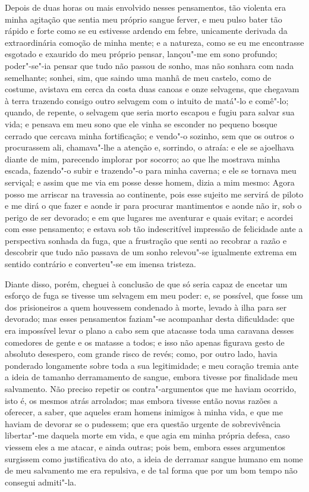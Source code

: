 Depois de duas horas ou mais envolvido nesses pensamentos, tão violenta
era minha agitação que sentia meu próprio sangue ferver, e meu pulso
bater tão rápido e forte como se eu estivesse ardendo em febre,
unicamente derivada da extraordinária comoção de minha mente; e a
natureza, como se eu me encontrasse esgotado e exaurido do meu próprio
pensar, lançou"-me em sono profundo; poder"-se"-ia pensar que tudo não
passou de sonho, mas não sonhara com nada semelhante; sonhei, sim, que
saindo uma manhã de meu castelo, como de costume, avistava em cerca da
costa duas canoas e onze selvagens, que chegavam à terra trazendo
consigo outro selvagem com o intuito de matá"-lo e comê"-lo; quando, de
repente, o selvagem que seria morto escapou e fugiu para salvar sua
vida; e pensava em meu sono que ele vinha se esconder no pequeno bosque
cerrado que cercava minha fortificação; e vendo"-o sozinho, sem que os
outros o procurassem ali, chamava"-lhe a atenção e, sorrindo, o atraía: e
ele se ajoelhava diante de mim, parecendo implorar por socorro; ao que
lhe mostrava minha escada, fazendo"-o subir e trazendo"-o para minha
caverna; e ele se tornava meu serviçal; e assim que me via em posse
desse homem, dizia a mim mesmo: Agora posso me arriscar na travessia ao
continente, pois esse sujeito me servirá de piloto e me dirá o que fazer
e aonde ir para procurar mantimentos e aonde não ir, sob o perigo de ser
devorado; e em que lugares me aventurar e quais evitar; e acordei com
esse pensamento; e estava sob tão indescritível impressão de felicidade
ante a perspectiva sonhada da fuga, que a frustração que senti ao
recobrar a razão e descobrir que tudo não passava de um sonho relevou"-se
igualmente extrema em sentido contrário e converteu"-se em imensa
tristeza.

Diante disso, porém, cheguei à conclusão de que só seria capaz de
encetar um esforço de fuga se tivesse um selvagem em meu poder: e, se
possível, que fosse um dos prisioneiros a quem houvessem condenado à
morte, levado à ilha para ser devorado; mas esses pensamentos faziam"-se
acompanhar desta dificuldade: que era impossível levar o plano a cabo
sem que atacasse toda uma caravana desses comedores de gente e os
matasse a todos; e isso não apenas figurava gesto de absoluto desespero,
com grande risco de revés; como, por outro lado, havia ponderado
longamente sobre toda a sua legitimidade; e meu coração tremia ante a
ideia de tamanho derramamento de sangue, embora tivesse por finalidade
meu salvamento. Não preciso repetir os contra"-argumentos que me haviam
ocorrido, isto é, os mesmos atrás arrolados; mas embora tivesse então
novas razões a oferecer, a saber, que aqueles eram homens inimigos à
minha vida, e que me haviam de devorar se o pudessem; que era questão
urgente de sobrevivência libertar"-me daquela morte em vida, e que agia
em minha própria defesa, caso viessem eles a me atacar, e ainda outras;
pois bem, embora esses argumentos surgissem como justificativa do ato, a
ideia de derramar sangue humano em nome de meu salvamento me era
repulsiva, e de tal forma que por um bom tempo não consegui admiti"-la.

